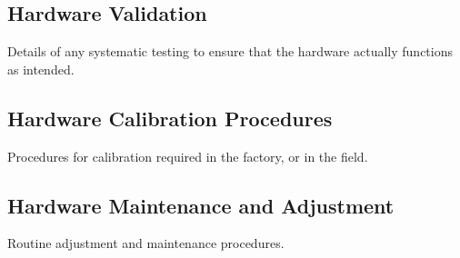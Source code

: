 \documentclass[MTRX3700report.tex]{subfiles}
\begin{document}
  \subsection{Hardware Validation}
  Details of any systematic testing to ensure that the hardware actually functions as intended.
  \subsection{Hardware Calibration Procedures}
  Procedures for calibration required in the factory, or in the field.
  \subsection{Hardware Maintenance and Adjustment}
  Routine adjustment and maintenance procedures.
\end{document}
